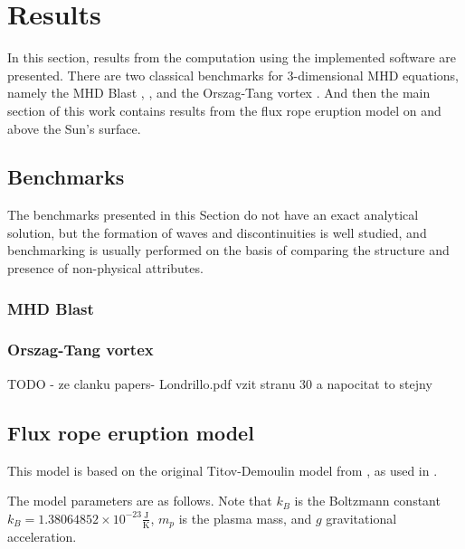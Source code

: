 \chapter{Results}
In this section, results from the computation using the implemented software are presented. There are two classical benchmarks for 3-dimensional MHD equations, namely the MHD Blast \cite{blast1}, \cite{blast2}, and the Orszag-Tang vortex \cite{vortex}. And then the main section of this work contains results from the flux rope eruption model on and above the Sun's surface.

\section{Benchmarks}
The benchmarks presented in this Section do not have an exact analytical solution, but the formation of waves and discontinuities is well studied, and benchmarking is usually performed on the basis of comparing the structure and presence of non-physical attributes.
\subsection{MHD Blast}
\label{sec:blast}


\subsection{Orszag-Tang vortex}

TODO - ze clanku papers- Londrillo.pdf vzit stranu 30 a napocitat to stejny

\section{Flux rope eruption model}
This model is based on the original Titov-Demoulin model from \cite{td}, as used in \cite{miraClanek}.

The model parameters are as follows. Note that $k_B$ is the Boltzmann constant $k_B = 1.38064852 \times 10^{-23} \frac{\mathrm{J}}{\mathrm{K}}$, $m_p$ is the plasma mass, and $g$ gravitational acceleration.

